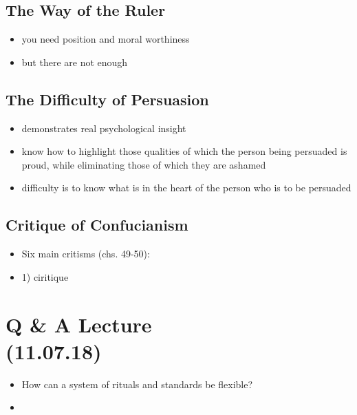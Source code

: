 \documentclass[emulatestandardclasses]{scrartcl}
\begin{document}
\subsection{The Way of the Ruler}

\begin{itemize}
  \item you need position and moral worthiness
  \item but there are not enough 
\end{itemize}
\subsection{The Difficulty of Persuasion}

\begin{itemize}
  \item demonstrates real psychological insight
  \item know how to highlight those qualities of which the person being persuaded is proud, while eliminating those of which they are ashamed
  \item difficulty is to know what is in the heart of the person who is to be persuaded
\end{itemize}

\subsection{Critique of Confucianism}

\begin{itemize}
  \item Six main critisms (chs. 49-50):
  \item 1) ciritique 
\end{itemize}


\section{Q \& A Lecture\\(11.07.18)}

\begin{itemize}
  \item How can a system of rituals and standards be flexible?
  \item 
\end{itemize}
\end{document}
